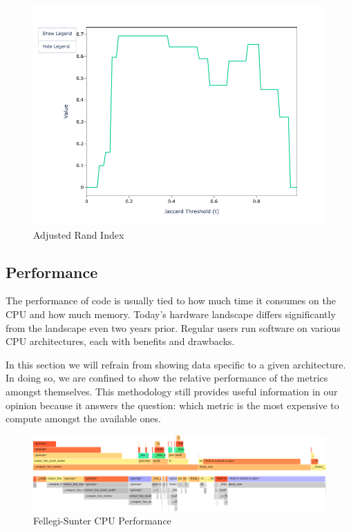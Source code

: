 \documentclass[11pt]{article}
\begin{document}
\begin{figure}[h!]
\begin{minipage}{0.32\textwidth}
            \includegraphics[width=\textwidth]{sample-usage/mini-alg-ari}
            \caption{Adjusted Rand Index}
        \end{minipage}
    \end{figure}

    \subsection{Performance}

    The performance of code is usually tied to how much time it consumes on the
    CPU and how much memory.
    Today's hardware landscape differs significantly from the landscape even two
    years prior.
    Regular users run software on various CPU architectures, each with benefits
    and drawbacks.
    
    In this section we will refrain from showing data specific to a given
    architecture.
    In doing so, we are confined to show the relative performance of the metrics
    amongst themselves.
    This methodology still provides useful information in our opinion because it
    answers the question: which metric is the most expensive to compute amongst
    the available ones.

    \begin{figure}[h!]
        \centering
        \includegraphics[width=\textwidth]{performance/fs-flamegraph}
        \caption{Fellegi-Sunter CPU Performance}\label{fig:fs-cpu-perf}
    \end{figure}
\end{document}
